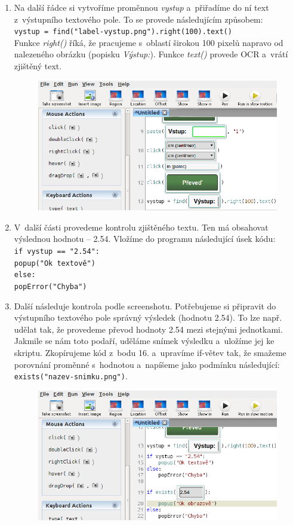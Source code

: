 \begin{enumerate}
				\item Na další řádce si vytvoříme proměnnou \emph{vystup} a~přiřadíme do ní text z~výstupního textového pole. To se provede následujícím způsobem:\\\texttt{vystup = find("label-vystup.png").right(100).text()}\\
				Funkce \emph{right()} říká, že pracujeme s~oblastí širokou 100 pixelů napravo od nalezeného obrázku (popisku \emph{Výstup:}). Funkce \emph{text()} provede OCR a~vrátí zjištěný text.
					\begin{figure}[ht!]
						\centering
						\includegraphics[width=12.5cm]{img/PrvniSkript/krok13.png}
					\end{figure}
					\FloatBarrier
				\item V~další části provedeme kontrolu zjištěného textu. Ten má obsahovat výslednou hodnotu -- 2.54. Vložíme do programu následující úsek kódu:\\\texttt{if vystup == "2.54":
					\\{\setlength{\parindent}{1cm}\indent popup("Ok textově")}
				\\else:
					\\{\setlength{\parindent}{1cm}\indent popError("Chyba")}}
				\item Další následuje  kontrola podle screenshotu. Potřebujeme si připravit do výstupního textového pole správný výsledek (hodnotu 2.54). To lze např. udělat tak, že provedeme převod hodnoty 2.54 mezi stejnými jednotkami. Jakmile se nám toto podaří, uděláme snímek výsledku a~uložíme jej ke skriptu. Zkopírujeme kód z~bodu 16. a~upravíme if-větev tak, že smažeme porovnání proměnné s~hodnotou a~napíšeme jako podmínku následující: \texttt{exists("nazev-snimku.png")}.
					\begin{figure}[ht!]
						\centering
						\includegraphics[width=12.5cm]{img/PrvniSkript/krok15.png}

\end{figure}
\end{enumerate}
